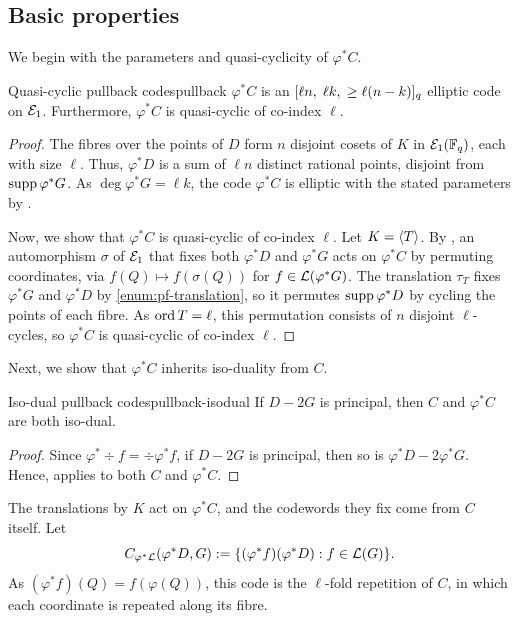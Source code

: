 \documentclass[twocolumn, 11pt]{scrartcl}
\begin{document}
\subsection{Basic properties} \label{subsection:basic-prop}

We begin with the parameters and quasi-cyclicity of $\varphi^*C$.

\begin{theorem}{Quasi-cyclic pullback codes}{pullback}
$\varphi^*C$ is an $[\ell n,\;\ell k,\;\geq\ell(n-k)]_q$ elliptic code on $\mathcal{E}_1$. Furthermore, $\varphi^*C$ is quasi-cyclic of co-index $\ell$.
\end{theorem}

\begin{proof}
The fibres over the points of $D$ form $n$ disjoint cosets of $K$ in $\mathcal{E}_1(\mathbb{F}_q)$, each with size $\ell$. Thus, $\varphi^*D$ is a sum of $\ell n$ distinct rational points, disjoint from $\operatorname{supp}\varphi^*G$. As $\deg\varphi^*G=\ell k$, the code $\varphi^*C$ is elliptic with the stated parameters by .

Now, we show that $\varphi^*C$ is quasi-cyclic of co-index $\ell$. Let $K=\langle T\rangle$. By \cite[Prop.~8.2.3(a)]{stichtenoth2009algebraic}, an automorphism $\sigma$ of $\mathcal{E}_1$ that fixes both $\varphi^*D$ and $\varphi^*G$ acts on $\varphi^*C$ by permuting coordinates, via $f(Q)\mapsto f(\sigma(Q))$ for $f\in\mathcal{L}(\varphi^*G)$. The translation $\tau_T$ fixes $\varphi^*G$ and $\varphi^*D$ by \ref{enum:pf-translation}, so it permutes $\operatorname{supp}\varphi^*D$ by cycling the points of each fibre. As $\operatorname{ord} T=\ell$, this permutation consists of $n$ disjoint $\ell$-cycles, so $\varphi^*C$ is quasi-cyclic of co-index $\ell$.
\end{proof}

Next, we show that $\varphi^*C$ inherits iso-duality from $C$.

\begin{corollary}{Iso-dual pullback codes}{pullback-isodual}
    If $D-2G$ is principal, then $C$ and $\varphi^*C$ are both iso-dual.
\end{corollary}

\begin{proof}
    Since $\varphi^*\div f=\div\varphi^*f$, if $D-2G$ is principal, then so is $\varphi^*D-2\varphi^*G$. Hence,  applies to both $C$ and $\varphi^*C$.
\end{proof}

The translations by $K$ act on $\varphi^*C$, and the codewords they fix come from $C$ itself. Let
\[ C_{\varphi^*\mathcal{L}}(\varphi^*D,G):=\{(\varphi^*f)(\varphi^*D):f\in\mathcal{L}(G)\}. \]
As $(\varphi^*f)(Q)=f(\varphi(Q))$, this code is the $\ell$-fold repetition of $C$, in which each coordinate is repeated along its fibre.
\end{document}
